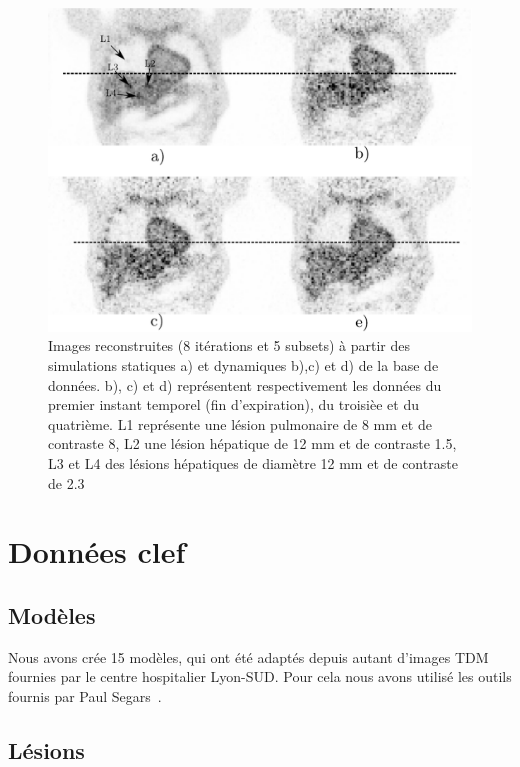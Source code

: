 \begin{figure}
 \centering
 \includegraphics[width=14cm]{images/exempleImageReconMouvement}
 \caption[Images respirantes reconstruites tirées de la base de donnée]{Images reconstruites (8 itérations et 5 subsets) à partir des simulations statiques a) et dynamiques b),c) et d) de la base de données. b), c) et d) représentent respectivement les données du premier instant temporel (fin d'expiration), du troisièe et du quatrième. L1 représente une lésion pulmonaire de 8 mm et de contraste 8, L2 une lésion hépatique de 12 mm et de contraste 1.5, L3 et L4 des lésions hépatiques de diamètre 12 mm et de contraste de 2.3}
 \label{fig:exempleImageReconMvt}
\end{figure}

\section{Données clef} %

\subsection{Modèles}

Nous avons crée 15 modèles, qui ont été adaptés depuis autant d'images TDM fournies par le centre hospitalier Lyon-SUD. Pour cela nous avons utilisé les outils fournis par Paul Segars~\cite{segars2001These}.


\subsection{Lésions}

